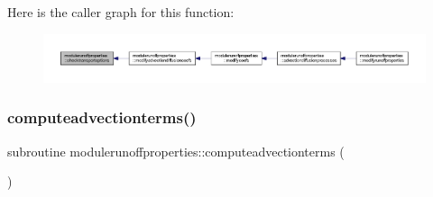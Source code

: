 Here is the caller graph for this function\+:\nopagebreak
\begin{figure}[H]
\begin{center}
\leavevmode
\includegraphics[width=350pt]{namespacemodulerunoffproperties_a5f610fc72802ac17615405bcd3f2f930_icgraph}
\end{center}
\end{figure}
\mbox{\label{namespacemodulerunoffproperties_a661de168b780c51098cc52f20f85f34b}} 
\subsubsection{\texorpdfstring{computeadvectionterms()}{computeadvectionterms()}}
{\footnotesize\ttfamily subroutine modulerunoffproperties\+::computeadvectionterms (\begin{DoxyParamCaption}{ }\end{DoxyParamCaption})\hspace{0.3cm}{\ttfamily [private]}}

